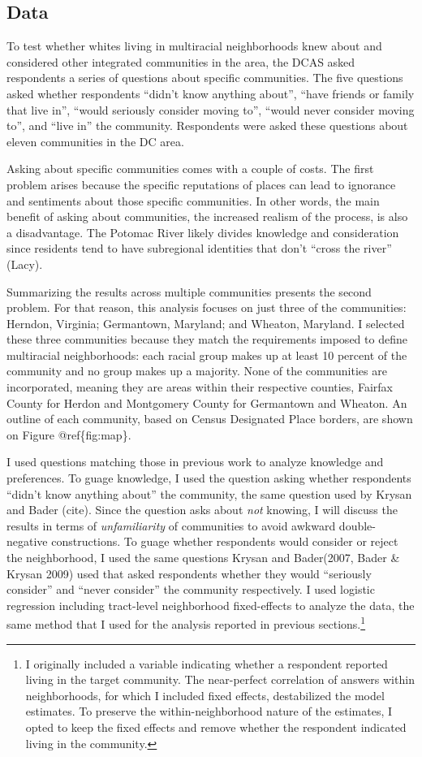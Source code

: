 \documentclass{baderart}
\begin{document}
\subsection{Data}\label{data}

To test whether whites living in multiracial neighborhoods knew about and considered other integrated communities in the area, the DCAS asked respondents a series of questions about specific communities. The five questions asked whether respondents ``didn't know anything about'', ``have friends or family that live in'', ``would seriously consider moving to'', ``would never consider moving to'', and ``live in'' the community. Respondents were asked these questions about eleven communities in the DC area.

Asking about specific communities comes with a couple of costs. The first problem arises because the specific reputations of places can lead to ignorance and sentiments about those specific communities. In other words, the main benefit of asking about communities, the increased realism of the process, is also a disadvantage. The Potomac River likely divides knowledge and consideration since residents tend to have subregional identities that don't ``cross the river'' (Lacy).

Summarizing the results across multiple communities presents the second problem. For that reason, this analysis focuses on just three of the communities: Herndon, Virginia; Germantown, Maryland; and Wheaton, Maryland. I selected these three communities because they match the requirements imposed to define multiracial neighborhoods: each racial group makes up at least 10 percent of the community and no group makes up a majority. None of the communities are incorporated, meaning they are areas within their respective counties, Fairfax County for Herdon and Montgomery County for Germantown and Wheaton. An outline of each community, based on Census Designated Place borders, are shown on Figure @ref\{fig:map\}.

I used questions matching those in previous work to analyze knowledge and preferences. To guage knowledge, I used the question asking whether respondents ``didn't know anything about'' the community, the same question used by Krysan and Bader (cite). Since the question asks about \emph{not} knowing, I will discuss the results in terms of \emph{unfamiliarity} of communities to avoid awkward double-negative constructions. To guage whether respondents would consider or reject the neighborhood, I used the same questions Krysan and Bader(2007, Bader \& Krysan 2009) used that asked respondents whether they would ``seriously consider'' and ``never consider'' the community respectively. I used logistic regression including tract-level neighborhood fixed-effects to analyze the data, the same method that I used for the analysis reported in previous sections.\footnote{I originally included a variable indicating whether a respondent reported living in the target community. The near-perfect correlation of answers within neighborhoods, for which I included fixed effects, destabilized the model estimates. To preserve the within-neighborhood nature of the estimates, I opted to keep the fixed effects and remove whether the respondent indicated living in the community.}
\end{document}
